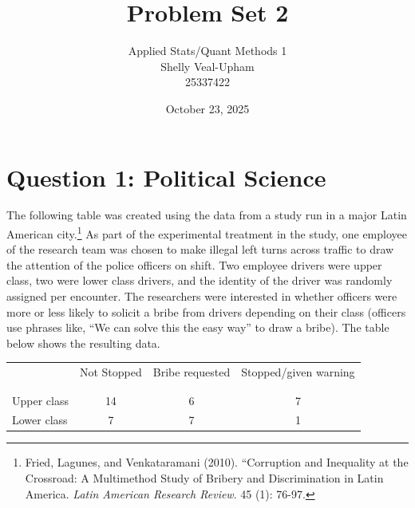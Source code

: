 \documentclass[12pt,letterpaper]{article}
\title{Problem Set 2}
\date{October 23, 2025}
\author{Applied Stats/Quant Methods 1\\
	Shelly Veal-Upham\\
	25337422}
\begin{document}
	\maketitle

	\vspace{.5cm}
	\section*{Question 1: Political Science}
		\vspace{.25cm}
	The following table was created using the data from a study run in a major Latin American city.\footnote{Fried, Lagunes, and Venkataramani (2010). ``Corruption and Inequality at the Crossroad: A Multimethod Study of Bribery and Discrimination in Latin America. \textit{Latin American Research Review}. 45 (1): 76-97.} As part of the experimental treatment in the study, one employee of the research team was chosen to make illegal left turns across traffic to draw the attention of the police officers on shift. Two employee drivers were upper class, two were lower class drivers, and the identity of the driver was randomly assigned per encounter. The researchers were interested in whether officers were more or less likely to solicit a bribe from drivers depending on their class (officers use phrases like, ``We can solve this the easy way'' to draw a bribe). The table below shows the resulting data.\\

\begin{table}[h!]
	\centering
	\begin{tabular}{l | c c c }
		& Not Stopped & Bribe requested & Stopped/given warning \\
		\\[-1.8ex] 
		\hline \\[-1.8ex]
		Upper class & 14 & 6 & 7 \\
		Lower class & 7 & 7 & 1 \\
		\hline
	\end{tabular}
\end{table}
\end{document}
